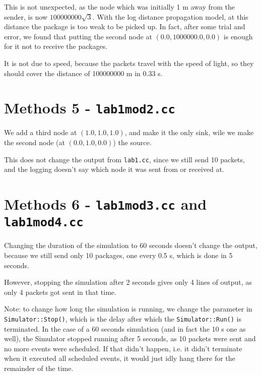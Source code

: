 \documentclass[11pt,journal]{article}
\begin{document}
	This is not unexpected, as the node which was initially 1 m away from the sender, is now $100000000 \sqrt{3}$. With the log distance propagation model, at this distance the package is too weak to be picked up. In fact, after some trial and error, we found that putting the second node at $(0.0,1000000.0, 0.0)$ is enough for it not to receive the packages.
	
	It is not due to speed, because the packets travel with the speed of light, so they should cover the distance of 100000000 m in 0.33 s.
	
	\section{Methods 5 - \texttt{lab1mod2.cc}}
	We add a third node at $(1.0, 1.0, 1.0)$, and make it the only sink, wile we make the second node (at $(0.0, 1.0, 0.0)$) the source.
	
	This does not change the output from \texttt{lab1.cc}, since we still send 10 packets, and the logging doesn't say which node it was sent from or received at.
	
	\section{Methods 6 - \texttt{lab1mod3.cc} and \texttt{lab1mod4.cc}}
	Changing the duration of the simulation to 60 seconds doesn't change the output, because we still send only 10 packages, one every 0.5 s, which is done in 5 seconds.
	
	However, stopping the simulation after 2 seconds gives only 4 lines of output, as only 4 packets got sent in that time. 
	
	Note: to change how long the simulation is running, we change the parameter in \texttt{Simulator::Stop()}, which is the delay after which the \texttt{Simulator::Run()} is terminated. In the case of a 60 seconds simulation (and in fact the 10 s one as well), the Simulator stopped running after 5 seconds, as 10 packets were sent and no more events were scheduled. If that didn't happen, i.e. it didn't terminate when it executed all scheduled events, it would just idly hang there for the remainder of the time.
	
	

	
\end{document}
